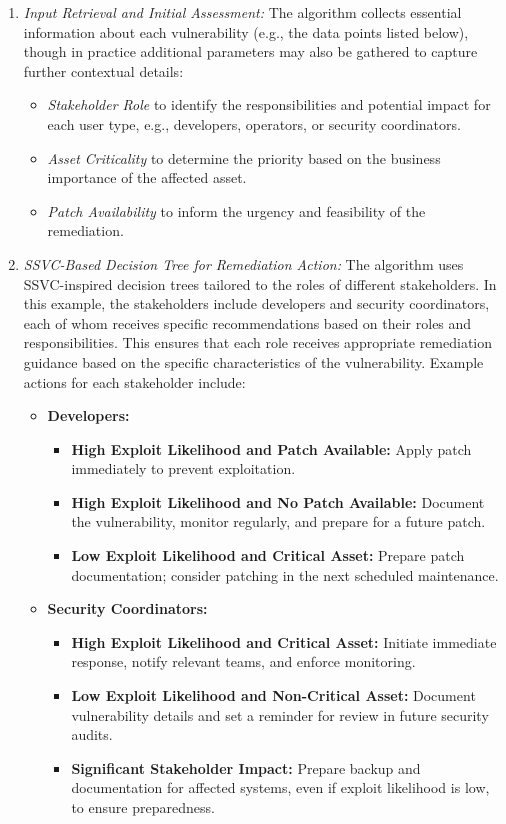 \begin{enumerate}
    \item \textit{Input Retrieval and Initial Assessment:}  
    The algorithm collects essential information about each vulnerability (e.g., the data points listed below), though in practice additional parameters may also be gathered to capture further contextual details:
    \begin{itemize}
        \item \emph{Stakeholder Role} to identify the responsibilities and potential impact for each user type, e.g., developers, operators, or security coordinators.
        \item \emph{Asset Criticality} to determine the priority based on the business importance of the affected asset.
        \item \emph{Patch Availability} to inform the urgency and feasibility of the remediation.
    \end{itemize}

    \item \textit{\ac{SSVC}-Based Decision Tree for Remediation Action:} The algorithm uses \ac{SSVC}-inspired decision trees tailored to the roles of different stakeholders. In this example, the stakeholders include developers and security coordinators, each of whom receives specific recommendations based on their roles and responsibilities. This ensures that each role receives appropriate remediation guidance based on the specific characteristics of the vulnerability. Example actions for each stakeholder include:
    \begin{itemize}
        \item \textbf{Developers:}
            \begin{itemize}
                \item \textbf{High Exploit Likelihood and Patch Available:} Apply patch immediately to prevent exploitation.
                \item \textbf{High Exploit Likelihood and No Patch Available:} Document the vulnerability, monitor regularly, and prepare for a future patch.
                \item \textbf{Low Exploit Likelihood and Critical Asset:} Prepare patch documentation; consider patching in the next scheduled maintenance.
            \end{itemize}
        \item \textbf{Security Coordinators:}
            \begin{itemize}
                \item \textbf{High Exploit Likelihood and Critical Asset:} Initiate immediate response, notify relevant teams, and enforce monitoring.
                \item \textbf{Low Exploit Likelihood and Non-Critical Asset:} Document vulnerability details and set a reminder for review in future security audits.
                \item \textbf{Significant Stakeholder Impact:} Prepare backup and documentation for affected systems, even if exploit likelihood is low, to ensure preparedness.
            \end{itemize}
    \end{itemize}


\end{enumerate}
